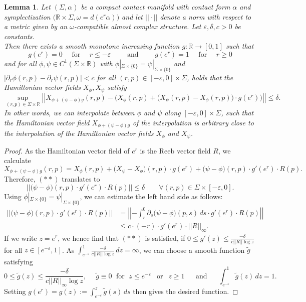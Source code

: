\documentclass[a4paper,12pt,bibliography=totocnumbered,titlepage=false,abstracton,bookmarksnumbered=true]{scrartcl}
\newcommand{\veps}{\varepsilon}
\newtheorem{lemme}[defn]{Lemma}
\theoremstyle{definition}
\begin{document}
\begin{lemme} \label{interpolation}
Let $(\Sigma,\alpha)$ be a compact contact manifold with contact form $\alpha$ and symplectization $\big(\mathbb{R}{\times}\Sigma,\omega{=}d(e^r\alpha)\big)$ and let $||\cdot||$ denote a norm with respect to a metric given by an $\omega$-compatible almost complex structure. Let $\veps,\delta,c>0$ be constants.\\
Then there exists a smooth monotone increasing function $g:\mathbb{R}\rightarrow[0,1]$ such that 
 \[g(e^r)=0\quad\text{ for }\quad r\leq -\veps\qquad\text{ and }\qquad g(e^r)=1\quad\text{ for }\quad r\geq 0\tag{$\ast$}\]
 and for all $\phi,\psi\in C^1(\Sigma\times\mathbb{R})$ with $\phi|_{\Sigma\times\{0\}}=\psi|_{\Sigma\times\{0\}}$ and $|\partial_r\phi(r,p)-\partial_r\psi(r,p)|<c$ for all $(r,p)\in[-\veps,0]{\times}\Sigma$, holds that the Hamiltonian vector fields $X_\phi, X_\psi$ satisfy
 \[\sup_{(r,p)\in\Sigma\times\mathbb{R}}\left|\left|X_{\phi+(\psi-\phi)g}(r,p)-\Big(X_\phi(r,p)+\big(X_\psi(r,p)-X_\phi(r,p)\big)\cdot g(e^r)\Big)\right|\right|\leq \delta.\tag{$\ast\ast$}\]
 In other words, we can interpolate between $\phi$ and $\psi$ along $[-\veps,0]\times\Sigma$, such that the Hamiltonian vector field $X_{\phi+(\psi-\phi)g}$ of the interpolation is arbitrary close to the interpolation of the Hamiltonian vector fields $X_\phi$ and $X_\psi$.
\end{lemme}
\begin{proof}
 As the Hamiltonian vector field of $e^r$ is the Reeb vector field $R$, we calculate
 \[X_{\phi+(\psi-\phi)g}(r,p)=X_\phi(r,p)+\big(X_\psi-X_\phi\big)(r,p)\cdot g(e^r)+\big(\psi-\phi\big)(r,p)\cdot g'(e^r)\cdot R(p).\]
Therefore, $(\ast\ast)$ translates to
\[ \left|\left|\big(\psi-\phi\big)(r,p)\cdot g'(e^r)\cdot R(p)\right| \right| \leq \delta \qquad\forall (r,p)\in\Sigma{\times}[-\veps,0].\]
Using $\phi|_{\Sigma\times\{0\}}=\psi|_{\Sigma\times\{0\}}$, we can estimate the left hand side as follows:
\begin{align*}
 \left|\left|\big(\psi-\phi\big)(r,p)\cdot g'(e^r)\cdot R(p)\right| \right|&=\left|\left|-\int_r^0\partial_s\big(\psi-\phi\big)(p,s)\,ds\cdot g'(e^r)\cdot R(p)\right| \right|\\
 &\leq c\cdot (-r) \cdot g'(e^r)\cdot ||R||_\infty.
\end{align*}
 If we write $z=e^r$, we hence find that $(\ast\ast)$ is satisfied, if $0\leq g'(z) \leq \frac{-\delta}{c||R||\log z}$ for all $z\in[e^{-\veps},1]$. As $\int_{e^{-\veps}}^1 \frac{-\delta}{c||R||\log z}\,dz=\infty$, we can choose a smooth function $\tilde{g}$ satisfying
 \[0\leq \tilde{g}(z)\leq \frac{-\delta}{c||R||_\infty \log z},\quad\; \tilde{g}\equiv 0 \;\text{ for } \;z\leq e^{-\veps}\,\;\text{ or }\;\,z\geq 1 \quad\; \text{ and }\quad\; \int_{e^{-\veps}}^1 \tilde{g}(z)\,dz = 1.\]
Setting $\displaystyle g(e^r)=g(z):=\int_{e^{-\veps}}^z\tilde{g}(s)\,ds$ then gives the desired function.
\end{proof}
\end{document}
